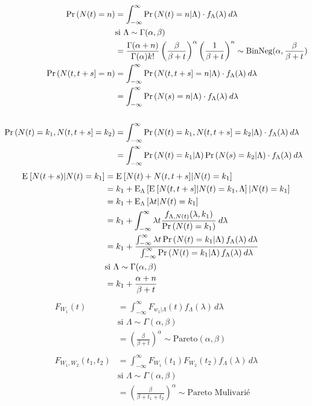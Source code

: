 \begin{align*}
    \prob{N(t) = n} &= \int_{-\infty}^\infty \prob{N(t) = n | \Lambda} \cdot f_\Lambda(\lambda)\: d\lambda \\ 
    &\text{si } \Lambda \sim \Gamma(\alpha, \beta) \\
    &= \frac{\Gamma(\alpha+n)}{\Gamma(\alpha)k!} \left( \frac{\beta}{\beta + t} \right)^\alpha \left( \frac{1}{\beta + t} \right)^n \sim \text{BinNeg}(\alpha, \frac{\beta}{\beta + t})
\\
    \prob{N(t, t+s] = n} &= \int_{-\infty}^\infty \prob{N(t, t+s] = n | \Lambda} \cdot f_\Lambda(\lambda)\: d\lambda \\
    &= \int_{-\infty}^\infty \prob{N(s) = n | \Lambda} \cdot f_\Lambda(\lambda)\: d\lambda 
\\ \\
    \prob{N(t) = k_1, N(t, t+s] = k_2} &= \int_{-\infty}^\infty \prob{N(t) = k_1, N(t, t+s] = k_2| \Lambda} \cdot f_\Lambda(\lambda)\: d\lambda \\
    &= \int_{-\infty}^\infty \prob{N(t) = k_1 | \Lambda} \prob{N(s) = k_2 | \Lambda}\cdot f_\Lambda(\lambda)\: d\lambda
\end{align*}
\begin{align*}
    \esp{N(t+s)|N(t) = k_1} &= \esp{N(t) + N(t, t+s] | N(t) = k_1} \\
    &= k_1 + \esp[\Lambda]{\esp{N(t, t+s]|N(t) = k_1, \Lambda}|N(t) = k_1} \\
    &= k_1 + \esp[\Lambda]{\lambda t|N(t) = k_1} \\
    &= k_1 + \int_{-\infty}^\infty \lambda t \frac{f_{\Lambda, N(t)}(\lambda, k_1)}{\prob{N(t) = k_1}}\: d\lambda \\
    &= k_1 + \frac{\int_{-\infty}^\infty\lambda t \prob{N(t) = k_1|\Lambda} f_\Lambda(\lambda)\:d\lambda}{\int_{-\infty}^\infty \prob{N(t) = k_1|\Lambda} f_\Lambda(\lambda)\:d\lambda} \\
    &\text{si } \Lambda \sim \Gamma(\alpha, \beta) \\
    &= k_1 + \frac{\alpha + n}{\beta + t}
\end{align*}
\begin{align*}
    F_{W_1}(t) &= \int_{-\infty}^\infty F_{w_1|\Lambda}(t) f_\Lambda(\lambda)\,d\lambda \\
    &\text{si } \Lambda \sim \Gamma(\alpha, \beta) \\
    &= \left( \frac{\beta}{\beta + t} \right)^\alpha \sim \text{Pareto}(\alpha, \beta)
\\ \\
    F_{W_1, W_2}(t_1, t_2) &= \int_{-\infty}^\infty F_{W_1}(t_1) F_{W_2}(t_2) f_\Lambda(\lambda)\,d\lambda\\
    &\text{si } \Lambda \sim \Gamma(\alpha, \beta) \\
    &= \left( \frac{\beta}{\beta + t_1 + t_2 } \right)^\alpha \sim \text{Pareto Mulivarié}
\end{align*}

